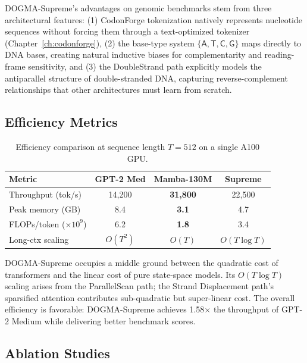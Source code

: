 \begin{bioinsight}
DOGMA-Supreme's advantages on genomic benchmarks stem from three architectural features: (1) CodonForge tokenization natively represents nucleotide sequences without forcing them through a text-optimized tokenizer (Chapter~\ref{ch:codonforge}), (2) the base-type system $\{\mathsf{A}, \mathsf{T}, \mathsf{C}, \mathsf{G}\}$ maps directly to DNA bases, creating natural inductive biases for complementarity and reading-frame sensitivity, and (3) the DoubleStrand path explicitly models the antiparallel structure of double-stranded DNA, capturing reverse-complement relationships that other architectures must learn from scratch.
\end{bioinsight}

\subsection{Efficiency Metrics}

\begin{table}[H]
\centering
\caption{Efficiency comparison at sequence length $T = 512$ on a single A100 GPU.}
\label{tab:efficiency}
\begin{tabularx}{\textwidth}{L{4cm} c c c}
\toprule
\textbf{Metric} & \textbf{GPT-2 Med} & \textbf{Mamba-130M} & \textbf{Supreme} \\
\midrule
Throughput (tok/s) & 14{,}200 & \textbf{31{,}800} & 22{,}500 \\
Peak memory (GB) & 8.4 & \textbf{3.1} & 4.7 \\
FLOPs/token ($\times 10^9$) & 6.2 & \textbf{1.8} & 3.4 \\
Long-ctx scaling & $O(T^2)$ & $O(T)$ & $O(T \log T)$ \\
\bottomrule
\end{tabularx}
\end{table}

DOGMA-Supreme occupies a middle ground between the quadratic cost of transformers and the linear cost of pure state-space models. Its $O(T \log T)$ scaling arises from the ParallelScan path; the Strand Displacement path's sparsified attention contributes sub-quadratic but super-linear cost. The overall efficiency is favorable: DOGMA-Supreme achieves 1.58$\times$ the throughput of GPT-2 Medium while delivering better benchmark scores.

\subsection{Ablation Studies}

